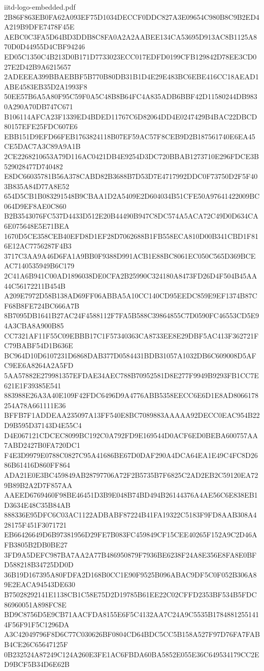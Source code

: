 \begin{filecontents*}[overwrite]{iitd-logo-embedded.pdf}
2B86F863EB0FA62A093EF75D1034DECCF0DDC827A3E09654C980B8C9B2ED4A219B9DFE7478F45E
AEBC0C3FA5D64BD3DDB8C8FA0A2A2AABEE134CA53695D913AC8B1125A870D0D44955D4CBF94246
ED05C1350C4B213D0B171D7733023ECC017EDFD0199CFB129842D78EE3CD027E2D42B9A6215657
2ADEEEA399BBAEBBF5B770B80DB31B1D4E29E483BC6EBE416CC18AEAD1ABE4583EB35D2A1993F8
50EE57B6A5A80F95C59F0A5C48B8B64FC4A835ADB6BBF42D11580244DB9830A290A70DB747C671
B106114AFCA23F1339ED4BDED11767C6D82064DD4E0247429B4BAC22DBCD80157EFE25FDC607E6
EBB151D9EFD66FEB1763824118B07EF59AC57F8CEB9D2B187561740E6EA45CE5DAC7A3C89A9A1B
2CE2268210653A79D116AC0421DB4E9254D3DC720BBAB1273710E296FDCE3B529028477D740482
E8DC66035781B56A378CABD82B3688B7D53D7E4717992DDC0F73750D2F5F403B835A84D77A8E52
654D5CB1B083291548B9CBAA1D2A5409E2D604034B51CFE50A97641422009BC064D9EF8AE0C860
B2B3543076FC537D4433D512E20B44490B947C8DC574A5ACA72C49D0D634CA6E075648E5E71BEA
1670D5CE358CEB40EFD8D1EF28D7062688B1FB558ECA810D00B341CBD1F816E12AC7756287F4B3
3717C3AA9A46D6FA1A9BB0F9388D991ACB1E88BC8061EC050C565D369BCEAC7140535949B6C179
2C41A6B941C00AD1896038DE0CFA2B25990C324180A8473FD26D4F504B45AA44C56172211B454B
A209E7972D58B138AD69FF06ABBA5A10CC140CD95EEDC859E9EF1374B87CF68B8FE724BC666A7B
8B7095DB1641B27AC24F4588112F7FA5B588C39864855C7D0590FC46553CD5E94A3CBA8A900B85
CC7321AF11F55C09EBBB17C1F57340363CA8733EE8E29DBF5AC413F362721FC79BABF54D1B636E
BC964D10D6107231D6868DAB377D0584431BDB31057A1032DB6C609008D5AFC9EE6A8264A2A5FD
5AA57882E279981357EFDAE34AEC788B70952581D8E277F9949B9293FB1CC7E621E1F39385E541
883988E26A3A40E109F42FDC6496D9A4776ABB5358EECC6E6D1E8AD8066178254A78A661111E36
BFFB7F1ADDEAA235097A13FF540E8BC7089883AAAAA92DECC0EAC954B22D9B595D37143D4E55C4
D4E067121CDCEC8099BC192C0A792FD9E169544D0ACF6ED0BEBA600757AA7ABD2427B0FA720DC1
F4E3D9979E0788C0827C95A41686BE67D0DAF290A4DCA64EA1E49C4FC8D2686B61416D860FF864
ADA21E0E3BC459849AB28797706A72F2B5735B7F6825C2AD2EB2C59120EA729B89B2A2D7F857AA
AAEED6769460F98BE46451D3B9E048B74BD494B26144376A4AE56C6E838EB1D3634E48C35B84AB
888336E95DFC6C03AC1122ADBABF87224B41FA19322C5183F9FD8AAB308A428175F451F3071721
EB66426649D6B97381956D29FE7B083FC459849CF15CEE40265F152A9C2D46AFB3805B2DB0BE27
3FD9A5DEFC987BA7AA2A77B486950879F7936BE6238F24A8E356E8FA8E0BFD588218B34725DD0D
36B19D167395A80FDFA2D168B0CC1E90F9525B096ABAC9DF5C0F052B306A89E2EACA94543DE630
B75028292141E1138CB1C58E75D2D19785B61EE22C02CFFD2353BF534B5FDC86960051A898FC8E
BD9C8756D5E9CB71AACFDA8155E6F5C4132AA7C24A9C5535B17848812551414F56F91F5C1296DA
A3C42049796F8D6C77C030626BF0804CD64BDC5CC5B158A527F97D76FA7FABB4CE26C65647125F
0B232524A87249C124A260E3FE1AC6FBDA60BA5852E055E36C649534179CC2ED9BCF5B34D6E62B

\end{filecontents*}
